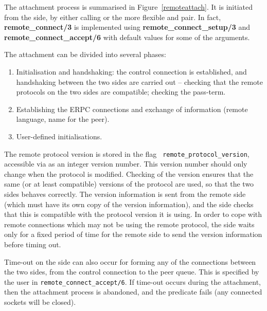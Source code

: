 The attachment process is summarised in Figure~\ref{remoteattach}. It is
initiated from the {\eclipse} side, by either calling
 or the more flexible 
and  pair. In fact, {\bf remote_connect/3} is implemented using {\bf
remote_connect_setup/3} and {\bf remote_connect_accept/6} with default
values for some of the arguments. 

The attachment can be divided into several phases: 

\begin{enumerate}
\item Initialisation and handshaking: the control connection is
established, and handshaking between the two sides are carried out --
checking that the remote protocols on the two sides are compatible;
checking the pass-term.
\item Establishing the ERPC connections and exchange of information
(remote language, {\eclipse} name for the peer).
\item User-defined initialisations.
\end{enumerate}

The remote protocol version is stored in the flag {\tt
remote_protocol_version}, accessible via 
as an integer version number.
This version number should only change when the protocol is
modified. Checking of the version ensures that the same (or at
least compatible) versions of the protocol are used, so that the two sides
behaves correctly. The version information is sent from the remote side
(which must have its own copy of the version information), and the
{\eclipse} side checks that this is compatible with the protocol version it
is using. In order to cope with remote connections which may not be using
the remote protocol, the {\eclipse} side waits only for a fixed period of
time for the remote side to send the version information before timing out.

Time-out on the {\eclipse} side can also occur for forming any of the
connections between the two sides, from the control connection to the peer
queue. This is specified by the user in {\tt remote_connect_accept/6}. If
time-out occurs during the attachment, then the attachment process is
abandoned, and the predicate fails (any connected sockets will be closed).

